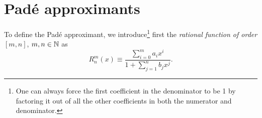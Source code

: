 \section{Pad\'e approximants}

To define the Pad\'e approximant, we introduce\footnote{One can always force
the first coefficient in the denominator to be 1 by factoring it out of all
the other coefficients in both the numerator and denominator.} first the {\it rational
function of order} $[m,n]$, $m,n\in\mathbb{N}$ as 
\begin{equation}
  R_n^m(x)\equiv\frac{\sum_{i=0}^m a_ix^i}{1+\sum_{j=1}^nb_jx^j}.
\end{equation}




